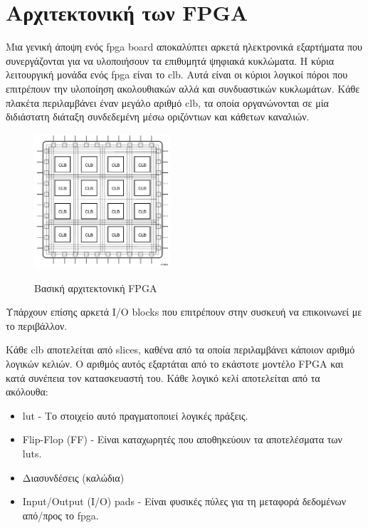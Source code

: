 \section{Αρχιτεκτονική των FPGA}

Μια γενική άποψη ενός \gls{fpga} board αποκαλύπτει αρκετά ηλεκτρονικά εξαρτήματα που συνεργάζονται για να υλοποιήσουν τα επιθυμητά ψηφιακά κυκλώματα. Η κύρια λειτουργική μονάδα ενός \gls{fpga} είναι το \gls{clb}. Αυτά είναι οι κύριοι λογικοί πόροι που επιτρέπουν την υλοποίηση ακολουθιακών αλλά και συνδυαστικών κυκλωμάτων. Κάθε πλακέτα περιλαμβάνει έναν μεγάλο αριθμό \gls{clb}, τα οποία οργανώνονται σε μία διδιάστατη διάταξη συνδεδεμένη μέσω οριζόντιων και κάθετων καναλιών.
\begin{figure}[H]
  	\centering
	\includegraphics[width=0.45\textwidth]{images/basic_fpga}\\
	\caption{Βασική αρχιτεκτονική FPGA\cite{clb1}}
	\label{fig:basic_fpga}
\end{figure}

Υπάρχουν επίσης αρκετά I/O blocks που επιτρέπουν στην συσκευή να επικοινωνεί με το περιβάλλον.

Κάθε \gls{clb} αποτελείται από slices, καθένα από τα οποία περιλαμβάνει κάποιον αριθμό λογικών κελιών. O αριθμός αυτός εξαρτάται από το εκάστοτε μοντέλο FPGΑ και κατά συνέπεια τον κατασκευαστή του. Κάθε λογικό κελί αποτελείται από τα ακόλουθα:
\begin{itemize}
\item \gls{lut} - Το στοιχείο αυτό πραγματοποιεί λογικές πράξεις.
\item Flip-Flop (FF) - Είναι καταχωρητές που αποθηκεύουν τα αποτελέσματα των \gls{lut}s.
\item Διασυνδέσεις (καλώδια)
\item Input/Output (I/O) pads - Είναι φυσικές πύλες για τη μεταφορά δεδομένων από/προς το \gls{fpga}.\\
\end{itemize}

